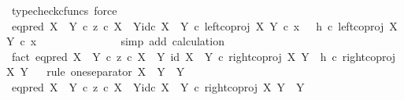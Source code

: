 \begin{isabellebody}
\ {\isacharparenleft}{\kern0pt}typecheck{\isacharunderscore}{\kern0pt}cfuncs{\isacharcomma}{\kern0pt}\ force{\isacharparenright}{\kern0pt}\isanewline
\ \ \ \ \ \ \isamarkupfalse%
\ \isamarkupfalse%
\ {\isachardoublequoteopen}{\isacharparenleft}{\kern0pt}{\isacharparenleft}{\kern0pt}eq{\isacharunderscore}{\kern0pt}pred\ {\isacharparenleft}{\kern0pt}X\ {\isasymCoprod}\ Y{\isacharparenright}{\kern0pt}\ {\isasymcirc}\isactrlsub c\ {\isasymlangle}z\ {\isasymcirc}\isactrlsub c\ {\isasymbeta}\isactrlbsub X\ {\isasymCoprod}\ Y\isactrlesub {\isacharcomma}{\kern0pt}id\isactrlsub c\ {\isacharparenleft}{\kern0pt}X\ {\isasymCoprod}\ Y{\isacharparenright}{\kern0pt}{\isasymrangle}{\isacharparenright}{\kern0pt}\ {\isasymcirc}\isactrlsub c\ left{\isacharunderscore}{\kern0pt}coproj\ X\ Y{\isacharparenright}{\kern0pt}\ {\isasymcirc}\isactrlsub c\ x\ \ {\isacharequal}{\kern0pt}\ {\isacharparenleft}{\kern0pt}h\ {\isasymcirc}\isactrlsub c\ left{\isacharunderscore}{\kern0pt}coproj\ X\ Y{\isacharparenright}{\kern0pt}\ {\isasymcirc}\isactrlsub c\ x{\isachardoublequoteclose}\isanewline
\ \ \ \ \ \ \ \ \ \ \ \ \ \isamarkupfalse%
\ {\isacharparenleft}{\kern0pt}simp\ add{\isacharcolon}{\kern0pt}\ calculation{\isacharparenright}{\kern0pt}\isanewline
\ \ \ \ \isamarkupfalse%
\isanewline
\ \ \isamarkupfalse%
\isanewline
\isanewline
\ \ \isamarkupfalse%
\ fact{}{\isacharcolon}{\kern0pt}\ {\isachardoublequoteopen}{\isacharparenleft}{\kern0pt}eq{\isacharunderscore}{\kern0pt}pred\ {\isacharparenleft}{\kern0pt}X\ {\isasymCoprod}\ Y{\isacharparenright}{\kern0pt}\ {\isasymcirc}\isactrlsub c\ {\isasymlangle}z\ {\isasymcirc}\isactrlsub c\ {\isasymbeta}\isactrlbsub X\ {\isasymCoprod}\ Y\isactrlesub {\isacharcomma}{\kern0pt}\ id\ {\isacharparenleft}{\kern0pt}X\ {\isasymCoprod}\ Y{\isacharparenright}{\kern0pt}{\isasymrangle}{\isacharparenright}{\kern0pt}\ {\isasymcirc}\isactrlsub c\ right{\isacharunderscore}{\kern0pt}coproj\ X\ Y\ {\isacharequal}{\kern0pt}\ h\ {\isasymcirc}\isactrlsub c\ right{\isacharunderscore}{\kern0pt}coproj\ X\ Y{\isachardoublequoteclose}\isanewline
\ \ \isamarkupfalse%
{\isacharparenleft}{\kern0pt}rule\ one{\isacharunderscore}{\kern0pt}separator{\isacharbrackleft}{\kern0pt}\ X\ {\isacharequal}{\kern0pt}\ Y{\isacharcomma}{\kern0pt}\ \ Y\ {\isacharequal}{\kern0pt}\ {\isasymOmega}{\isacharbrackright}{\kern0pt}{\isacharparenright}{\kern0pt}\isanewline
\ \ \ \ \isamarkupfalse%
\ {\isachardoublequoteopen}{\isacharparenleft}{\kern0pt}eq{\isacharunderscore}{\kern0pt}pred\ {\isacharparenleft}{\kern0pt}X\ {\isasymCoprod}\ Y{\isacharparenright}{\kern0pt}\ {\isasymcirc}\isactrlsub c\ {\isasymlangle}z\ {\isasymcirc}\isactrlsub c\ {\isasymbeta}\isactrlbsub X\ {\isasymCoprod}\ Y\isactrlesub {\isacharcomma}{\kern0pt}id\isactrlsub c\ {\isacharparenleft}{\kern0pt}X\ {\isasymCoprod}\ Y{\isacharparenright}{\kern0pt}{\isasymrangle}{\isacharparenright}{\kern0pt}\ {\isasymcirc}\isactrlsub c\ right{\isacharunderscore}{\kern0pt}coproj\ X\ Y\ {\isacharcolon}{\kern0pt}\ Y\ {\isasymrightarrow}\ {\isasymOmega}{\isachardoublequoteclose}\isanewline

\end{isabellebody}
